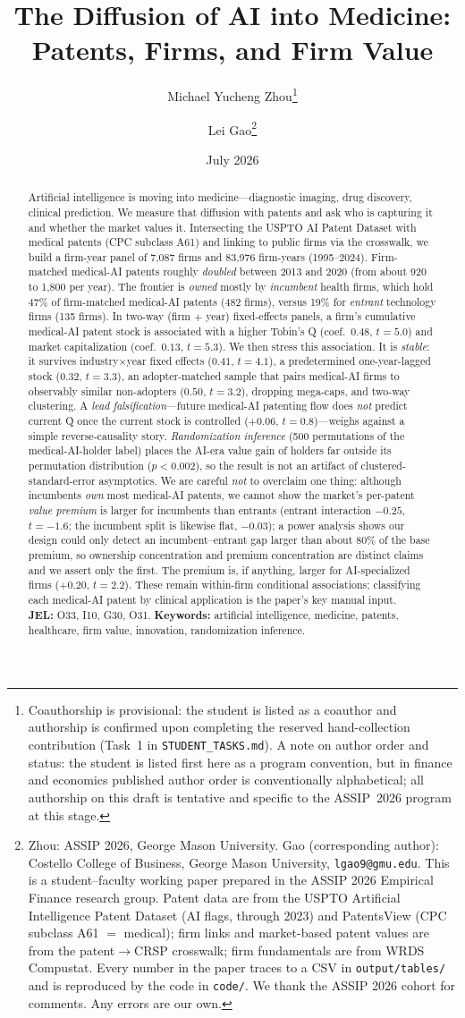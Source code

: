 \documentclass[12pt]{article}
\title{\textbf{The Diffusion of AI into Medicine:\\
Patents, Firms, and Firm Value}}
\author{Michael Yucheng Zhou\thanks{Coauthorship is provisional: the student is listed as a coauthor and authorship is confirmed upon completing the reserved hand-collection contribution (Task~1 in \texttt{STUDENT\_TASKS.md}). A note on author order and status: the student is listed first here as a program convention, but in finance and economics published author order is conventionally alphabetical; all authorship on this draft is tentative and specific to the ASSIP~2026 program at this stage.} \and Lei Gao\thanks{Zhou: ASSIP 2026, George Mason
University. Gao (corresponding author): Costello College of Business, George Mason University,
\texttt{lgao9@gmu.edu}. This is a student--faculty working paper prepared in the ASSIP 2026
Empirical Finance research group. Patent data are from the USPTO Artificial Intelligence Patent
Dataset (AI flags, through 2023) and PatentsView (CPC subclass A61 $=$ medical); firm links and
market-based patent values are from the \citet{kpss2017} patent$\to$CRSP crosswalk; firm
fundamentals are from WRDS Compustat. Every number in the paper traces to a CSV in
\texttt{output/tables/} and is reproduced by the code in \texttt{code/}. We thank the ASSIP 2026
cohort for comments. Any errors are our own.}}
\date{July 2026}
\begin{document}
\maketitle

\begin{abstract}
\noindent Artificial intelligence is moving into medicine---diagnostic imaging, drug discovery,
clinical prediction. We measure that diffusion with patents and ask who is capturing it and
whether the market values it. Intersecting the USPTO AI Patent Dataset with medical patents
(CPC subclass A61) and linking to public firms via the \citet{kpss2017} crosswalk, we build a
firm-year panel of 7{,}087 firms and 83{,}976 firm-years (1995--2024). Firm-matched medical-AI
patents roughly \emph{doubled} between 2013 and 2020 (from about 920 to 1{,}800 per year). The
frontier is \emph{owned} mostly by \emph{incumbent} health firms, which hold 47\% of firm-matched
medical-AI patents (482 firms), versus 19\% for \emph{entrant} technology firms (135 firms). In
two-way (firm $+$ year) fixed-effects panels, a firm's cumulative medical-AI patent stock is
associated with a higher Tobin's Q (coef.\ $0.48$, $t=5.0$) and market capitalization (coef.\
$0.13$, $t=5.3$). We then stress this association. It is \emph{stable}: it survives
industry$\times$year fixed effects ($0.41$, $t=4.1$), a predetermined one-year-lagged stock
($0.32$, $t=3.3$), an adopter-matched sample that pairs medical-AI firms to observably similar
non-adopters ($0.50$, $t=3.2$), dropping mega-caps, and two-way clustering. A \emph{lead
falsification}---future medical-AI patenting flow does \emph{not} predict current Q once the
current stock is controlled ($+0.06$, $t=0.8$)---weighs against a simple reverse-causality story.
\emph{Randomization inference} (500 permutations of the medical-AI-holder label) places the
AI-era value gain of holders far outside its permutation distribution ($p<0.002$), so the result
is not an artifact of clustered-standard-error asymptotics. We are careful \emph{not} to overclaim
one thing: although incumbents \emph{own} most medical-AI patents, we cannot show the market's
per-patent \emph{value premium} is larger for incumbents than entrants (entrant interaction
$-0.25$, $t=-1.6$; the incumbent split is likewise flat, $-0.03$); a power analysis shows our
design could only detect an incumbent--entrant gap larger
than about 80\% of the base premium, so ownership concentration and premium concentration are
distinct claims and we assert only the first. The premium is, if anything, larger for
AI-specialized firms ($+0.20$, $t=2.2$). These remain within-firm conditional associations;
classifying each medical-AI patent by clinical application is the paper's key manual input.\\[4pt]
\noindent\textbf{JEL:} O33, I10, G30, O31. \quad
\textbf{Keywords:} artificial intelligence, medicine, patents, healthcare, firm value, innovation,
randomization inference.
\end{abstract}
\end{document}
